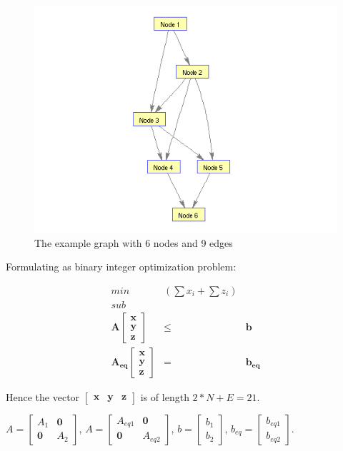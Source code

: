 \documentclass[authoryear,preprint,review,12pt]{elsarticle}
\begin{document}
\begin{figure}[h]
\includegraphics[scale=0.75]{images/testGraph}\caption{The example graph with 6 nodes and 9 edges}
\end{figure}


Formulating as binary integer optimization problem:

\begin{eqnarray*}
min & (\sum x_{i}+\sum z_{i})\\
sub\\
\mathbf{A}\left[\begin{array}{c}
\mathbf{x}\\
\mathbf{y}\\
\mathbf{z}
\end{array}\right] & \leq & \mathbf{b}\\
\mathbf{A_{eq}}\left[\begin{array}{c}
\mathbf{x}\\
\mathbf{y}\\
\mathbf{z}
\end{array}\right] & = & \mathbf{b_{eq}}
\end{eqnarray*}


Hence the vector $\left[\mathbf{\begin{array}{ccc}
\mathbf{x} & y & z\end{array}}\right]$ is of length $2*N+E=21$.

$A=\left[\begin{array}{cc}
A_{1} & \mathbf{0}\\
\mathbf{0} & A_{2}
\end{array}\right]$, $A=\left[\begin{array}{cc}
A_{eq1} & \mathbf{0}\\
\mathbf{0} & A_{eq2}
\end{array}\right]$, $b=\left[\begin{array}{c}
b_{1}\\
b_{2}
\end{array}\right]$, $b_{eq}=\left[\begin{array}{c}
b_{eq1}\\
b_{eq2}
\end{array}\right]$.\\
\end{document}
